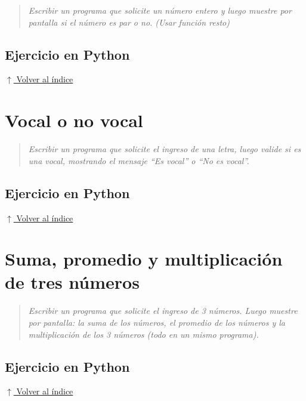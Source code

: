 \documentclass[12pt]{article}
\newcommand{\codigopython}[2]{%
}
\newcommand{\volverindice}{%
    \vspace{1em}%
    \begin{flushright}%
        \hyperlink{indice}{\small $\uparrow$ Volver al índice}%
    \end{flushright}%
}
\newcommand{\enunciado}[1]{%
    \begin{quote}
        \itshape #1
    \end{quote}
}
\begin{document}
\enunciado{Escribir un programa que solicite un número entero y luego muestre por pantalla si el número es par o no. (Usar función resto)}

\subsection*{Ejercicio en Python}

\codigopython{03}{Número par o impar}

\volverindice
\newpage


\section{Vocal o no vocal}

\enunciado{Escribir un programa que solicite el ingreso de una letra, luego valide si es una vocal, mostrando el mensaje \enquote{Es vocal} o \enquote{No es vocal}.}

\subsection*{Ejercicio en Python}

\codigopython{04}{Vocal o no vocal}

\volverindice
\newpage


\section{Suma, promedio y multiplicación de tres números}

\enunciado{Escribir un programa que solicite el ingreso de 3 números. Luego muestre por pantalla: la suma de los números, el promedio de los números y la multiplicación de los 3 números (todo en un mismo programa).}

\subsection*{Ejercicio en Python}

\codigopython{05}{Suma, promedio y multiplicación de tres números}

\volverindice
\newpage

\end{document}
